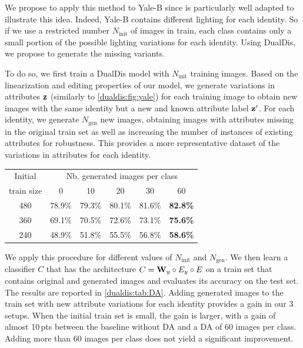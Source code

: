 We propose to apply this method to Yale-B since is particularly well adapted to illustrate this idea. Indeed, Yale-B contains different lighting for each identity. So if we use a restricted number $N_\textrm{init}$ of images in train, each class contains only a small portion of the possible lighting variations for each identity. Using DualDis, we propose to generate the missing variants.

To do so, we first train a DualDis model with $N_\textrm{init}$ training images. Based on the linearization and editing properties of our model, we generate variations in attributes $\mathbf{z}$ (similarly to \autoref{dualdis:fig:yale}) for each training image to obtain new images with the same identity but a new and known attribute label $\mathbf{z}'$. For each identity, we generate $N_\textrm{gen}$ new images,
obtaining images with attributes missing in the original train set as well as increasing the number of instances of existing attributes for robustness. This provides a more representative dataset of the variations in attributes for each identity.

\begin{table}[tb]
	\centering
\setlength{\tabcolsep}{4pt}
\begin{tabular}{@{}cccccc@{}}
        \toprule
        Initial     & \multicolumn{5}{c}{Nb. generated images per class}  \\
        \cmidrule{2-6}
        train size  & 0 & 10 & 20 & 30 & 60 \\
        \midrule
        480 & 78.9\% & 79.3\% & 80.1\% & 81.6\% & \textbf{82.8\%} \\
        360 & 69.1\% & 70.5\% & 72.6\% & 73.1\% & \textbf{75.6\%} \\
        240 & 48.9\% & 51.8\% & 55.5\% & 56.8\% & \textbf{58.6\%} \\
        \bottomrule
    \end{tabular}
	\label{dualdis:tab:DA}
\end{table}

We apply this procedure for different values of $N_\textrm{init}$ and $N_\textrm{gen}$. We then learn a classifier $C$ that has the architecture $C = \mathbf{W}_y \circ E_y \circ E$
on a train set that contains original and generated images and evaluates its accuracy on the test set. The results are reported in \autoref{dualdis:tab:DA}. Adding generated images to the train set with new attribute variations for each identity provides a gain in our 3 setups. When the initial train set is small, the gain is larger, with a gain of almost 10\,pts between the baseline without \ac{DA} and a \ac{DA} of 60 images per class. Adding more than 60 images per class does not yield a significant improvement.




